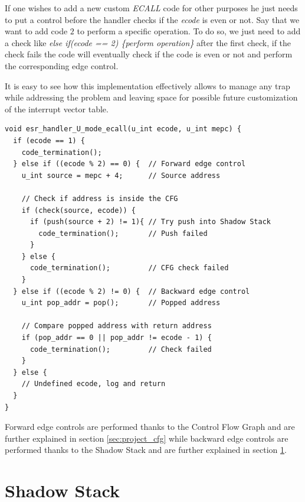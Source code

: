 If one wishes to add a new custom \textit{ECALL} code for other purposes he just
needs to put a control before the handler checks if the \textit{ecode} is even or
not. Say that we want to add code $2$ to perform a specific operation. To do so,
we just need to add a check like \textit{else if(ecode == 2) \{perform operation\}}
after the first check, if the check fails the code will eventually check if the
code is even or not and perform the corresponding edge control.

It is easy to see how this implementation effectively allows to manage any trap
while addressing the problem and leaving space for possible future customization
of the interrupt vector table.

\begin{lstlisting}[style=CStyle, caption = U-mode \textit{ECALL} handler, label={lst:ecallhandler}]
void esr_handler_U_mode_ecall(u_int ecode, u_int mepc) {
  if (ecode == 1) {
    code_termination();
  } else if ((ecode % 2) == 0) {  // Forward edge control
    u_int source = mepc + 4;      // Source address

    // Check if address is inside the CFG
    if (check(source, ecode)) {
      if (push(source + 2) != 1){ // Try push into Shadow Stack
        code_termination();       // Push failed
      }
    } else {
      code_termination();         // CFG check failed
    }
  } else if ((ecode % 2) != 0) {  // Backward edge control
    u_int pop_addr = pop();       // Popped address

    // Compare popped address with return address
    if (pop_addr == 0 || pop_addr != ecode - 1) {
      code_termination();         // Check failed
    }
  } else {
    // Undefined ecode, log and return
  }
}
\end{lstlisting}

Forward edge controls are performed thanks to the Control Flow Graph and are further
explained in section \ref{sec:project_cfg} while backward edge controls are performed
thanks to the Shadow Stack and are further explained in section \ref{sec:project_ss}.

\section{Shadow Stack}
\label{sec:project_ss}

